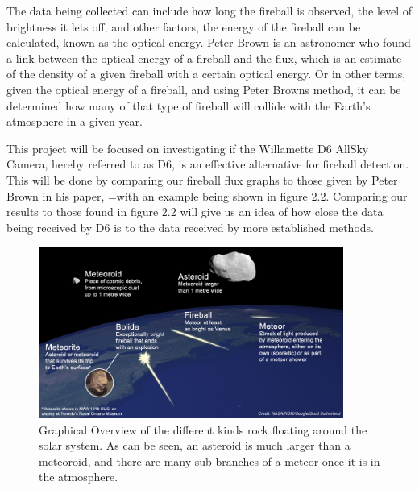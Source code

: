 The data being collected can include how long the fireball is observed, the level of brightness it lets off, and other factors, the energy of the fireball can be calculated, known as the optical energy. 
Peter Brown is an astronomer who found a link between the optical energy of a fireball and the flux, which is an estimate of the density of a given fireball with a certain optical energy. 
Or in other terms, given the optical energy of a fireball, and using Peter Browns method, it can be determined how many of that type of fireball will collide with the Earth's atmosphere in a given year.

This project will be focused on investigating if the Willamette D6 AllSky Camera, hereby referred to as D6, is an effective alternative for fireball detection. 
This will be done by comparing our fireball flux graphs to those given by Peter Brown in his paper, =with an example being shown in figure 2.2. 
Comparing our results to those found in figure 2.2 will give us an idea of how close the data being received by D6 is to the data received by more established methods.




\begin{figure}
    \centering
    \includegraphics[width=10cm]{Meteor_comparison.png}
    \centering
    \caption{Graphical Overview of the different kinds rock floating around the solar system. As can be seen, an asteroid is much larger than a meteoroid, and there are many sub-branches of a meteor once it is in the atmosphere.}
    \label{fig: 1.1}
\end{figure}

